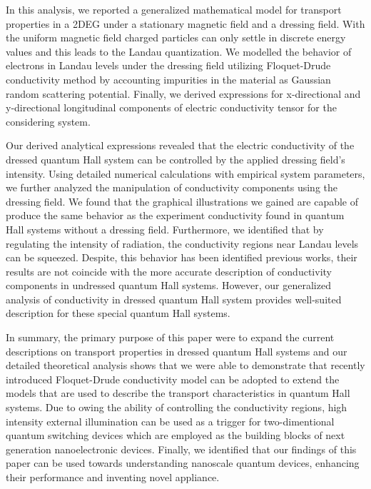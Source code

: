 In this analysis, we reported a generalized mathematical model for transport properties in a 2DEG under a stationary magnetic field and a dressing field. With the uniform magnetic field charged particles can only settle in discrete energy values and this leads to the Landau quantization. We modelled the behavior of electrons in Landau levels under the dressing field utilizing Floquet-Drude conductivity method by accounting impurities in the material as Gaussian random scattering potential. Finally, we derived expressions for x-directional and y-directional longitudinal components of electric conductivity tensor for the considering system.

Our derived analytical expressions revealed that the electric conductivity of the dressed quantum Hall system can be controlled by the applied dressing field’s intensity. Using detailed numerical calculations with empirical system parameters, we further analyzed the manipulation of conductivity components using the dressing field. We found that the graphical illustrations we gained are capable of produce the same behavior as the experiment conductivity found in quantum Hall systems without a dressing field. Furthermore, we identified that by regulating the intensity of radiation, the conductivity regions near Landau levels can be squeezed. Despite, this behavior has been identified previous works, their results are not coincide with the more accurate description of conductivity components in undressed quantum Hall systems. However, our generalized analysis of conductivity in dressed quantum Hall system provides well-suited description for  these special quantum Hall systems.

In summary, the primary purpose of this paper were to expand the current descriptions on transport properties in dressed quantum Hall systems and our  detailed theoretical analysis shows that we were able to demonstrate that recently introduced Floquet-Drude conductivity model can be adopted to extend the models that are used to describe the transport characteristics in quantum Hall systems. Due to owing the ability of controlling the conductivity regions, high intensity external illumination can be used as a trigger for two-dimentional quantum switching devices which are employed as the building blocks of next generation nanoelectronic devices. Finally, we identified that our findings of this paper can be used towards understanding nanoscale quantum devices, enhancing their performance and inventing novel appliance.
